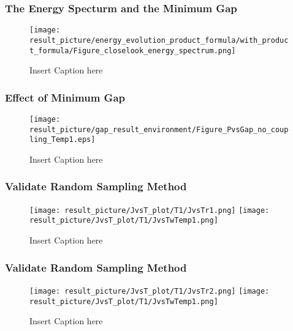 \documentclass{beamer}
\begin{document}
\begin{frame}
	\frametitle{The Energy Specturm and the Minimum Gap}
	\begin{figure}
		\centering
		\texttt{[image: result\_picture/energy\_evolution\_product\_formula/with\_product\_formula/Figure\_closelook\_energy\_spectrum.png]}
		
		\caption{Insert Caption here}
	\end{figure}
\end{frame}

\begin{frame}
	\frametitle{Effect of Minimum Gap}

	\begin{figure}
		\centering
		\texttt{[image: result\_picture/gap\_result\_environment/Figure\_PvsGap\_no\_coupling\_Temp1.eps]}
		
		\caption{Insert Caption here}
	\end{figure}
\end{frame}

\begin{frame}
	\frametitle{Validate Random Sampling Method}
	\begin{figure}
		\centering
		\texttt{[image: result\_picture/JvsT\_plot/T1/JvsTr1.png]}
		\hfill
		\texttt{[image: result\_picture/JvsT\_plot/T1/JvsTwTemp1.png]}		
		
		\caption{Insert Caption here}
	\end{figure}
\end{frame}

\begin{frame}
	\frametitle{Validate Random Sampling Method}
	\begin{figure}
		\centering
		\texttt{[image: result\_picture/JvsT\_plot/T1/JvsTr2.png]}
		\hfill
		\texttt{[image: result\_picture/JvsT\_plot/T1/JvsTwTemp1.png]}		
		
		\caption{Insert Caption here}
	\end{figure}
\end{frame}
\end{document}
